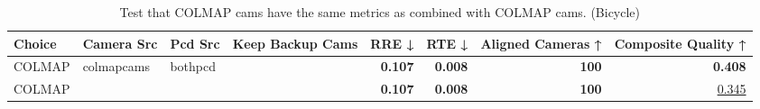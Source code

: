 \begin{table}[H]
\caption{Test that COLMAP cams have the same metrics as combined with COLMAP cams. (Bicycle)}
\label{tab:07_combined_test_bicycle}
\begin{tabular}{lllrrrrr}
\toprule
Choice & Camera Src & Pcd Src & Keep Backup Cams & RRE ↓ & RTE ↓ & Aligned Cameras ↑ & Composite Quality ↑ \\
\midrule
COLMAP & colmapcams & bothpcd &  & \textbf{0.107} & \textbf{0.008} & \textbf{100} & \textbf{0.408} \\
COLMAP &  &  &  & \textbf{0.107} & \textbf{0.008} & \textbf{100} & \underline{0.345} \\
\bottomrule
\end{tabular}
\end{table}
